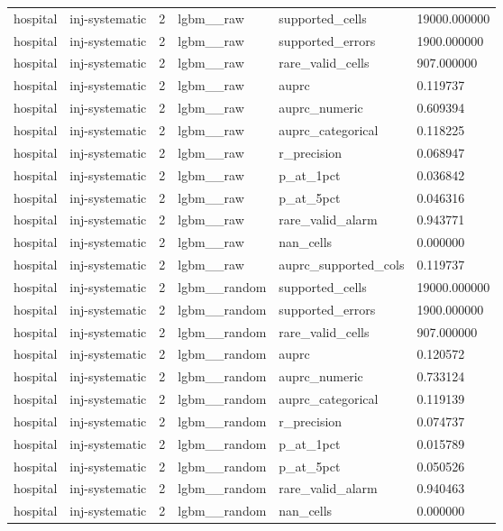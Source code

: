 \begin{tabular}{llllll}
hospital & inj-systematic & 2 & lgbm\_\_raw & supported\_cells & 19000.000000 \\
hospital & inj-systematic & 2 & lgbm\_\_raw & supported\_errors & 1900.000000 \\
hospital & inj-systematic & 2 & lgbm\_\_raw & rare\_valid\_cells & 907.000000 \\
hospital & inj-systematic & 2 & lgbm\_\_raw & auprc & 0.119737 \\
hospital & inj-systematic & 2 & lgbm\_\_raw & auprc\_numeric & 0.609394 \\
hospital & inj-systematic & 2 & lgbm\_\_raw & auprc\_categorical & 0.118225 \\
hospital & inj-systematic & 2 & lgbm\_\_raw & r\_precision & 0.068947 \\
hospital & inj-systematic & 2 & lgbm\_\_raw & p\_at\_1pct & 0.036842 \\
hospital & inj-systematic & 2 & lgbm\_\_raw & p\_at\_5pct & 0.046316 \\
hospital & inj-systematic & 2 & lgbm\_\_raw & rare\_valid\_alarm & 0.943771 \\
hospital & inj-systematic & 2 & lgbm\_\_raw & nan\_cells & 0.000000 \\
hospital & inj-systematic & 2 & lgbm\_\_raw & auprc\_supported\_cols & 0.119737 \\
hospital & inj-systematic & 2 & lgbm\_\_random & supported\_cells & 19000.000000 \\
hospital & inj-systematic & 2 & lgbm\_\_random & supported\_errors & 1900.000000 \\
hospital & inj-systematic & 2 & lgbm\_\_random & rare\_valid\_cells & 907.000000 \\
hospital & inj-systematic & 2 & lgbm\_\_random & auprc & 0.120572 \\
hospital & inj-systematic & 2 & lgbm\_\_random & auprc\_numeric & 0.733124 \\
hospital & inj-systematic & 2 & lgbm\_\_random & auprc\_categorical & 0.119139 \\
hospital & inj-systematic & 2 & lgbm\_\_random & r\_precision & 0.074737 \\
hospital & inj-systematic & 2 & lgbm\_\_random & p\_at\_1pct & 0.015789 \\
hospital & inj-systematic & 2 & lgbm\_\_random & p\_at\_5pct & 0.050526 \\
hospital & inj-systematic & 2 & lgbm\_\_random & rare\_valid\_alarm & 0.940463 \\
hospital & inj-systematic & 2 & lgbm\_\_random & nan\_cells & 0.000000 \\

\end{tabular}
